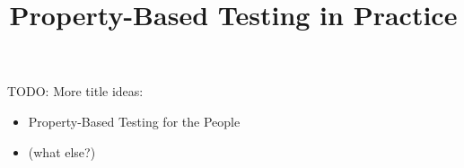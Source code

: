 \documentclass{NSF}
\newcommand{\todo}[1]{{\color{nord-red} TODO: #1}}
\begin{document}
\title{Property-Based Testing in Practice}

\bigskip\bigskip\bigskip\bigskip
\todo{More title ideas:
  \begin{itemize}
  \item Property-Based Testing for the People
  \item (what else?)
  \end{itemize}
}

\newpage





\newpage{}


\newpage{}
\renewcommand\refname{References Cited}

% 


\newpage{}


\newpage{}


\newpage{}


\newpage{}


\newpage{}
\end{document}
